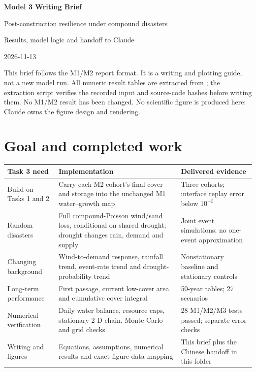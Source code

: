 \documentclass[11pt,a4paper]{article}
\newcommand{\file}[1]{{\small\texttt{\detokenize{#1}}}}
\begin{document}
\thispagestyle{plain}
\begin{center}
{\LARGE\bfseries Model 3 Writing Brief}\par
{\large Post-construction resilience under compound disasters}\par
{\large Results, model logic and handoff to Claude}\par
2026-11-13
\end{center}

This brief follows the M1/M2 report format. It is a writing and plotting guide, not a new model run.
All numeric result tables are extracted from \file{Results/v7/model3/}; the extraction script verifies
the recorded input and source-code hashes before writing them. No M1/M2 result has been changed.
No scientific figure is produced here: Claude owns the figure design and rendering.

\section{Goal and completed work}
\begin{tabularx}{\textwidth}{@{}p{3.4cm}YY@{}}
\toprule Task 3 need & Implementation & Delivered evidence \\\midrule
Build on Tasks 1 and 2 & Carry each M2 cohort's final cover and storage into the unchanged M1 water--growth map & Three cohorts; interface replay error below $10^{-5}$ \\
Random disasters & Full compound-Poisson wind/sand loss, conditional on shared drought; drought changes rain, demand and supply & Joint event simulations; no one-event approximation \\
Changing background & Wind-to-demand response, rainfall trend, event-rate trend and drought-probability trend & Nonstationary baseline and stationary controls \\
Long-term performance & First passage, current low-cover area and cumulative cover integral & 50-year tables; 27 scenarios \\
Numerical verification & Daily water balance, resource caps, stationary 2-D chain, Monte Carlo and grid checks & 28 M1/M2/M3 tests passed; separate error checks \\
Writing and figures & Equations, assumptions, numerical results and exact figure data mapping & This brief plus the Chinese handoff in this folder \\
\bottomrule
\end{tabularx}
\end{document}
